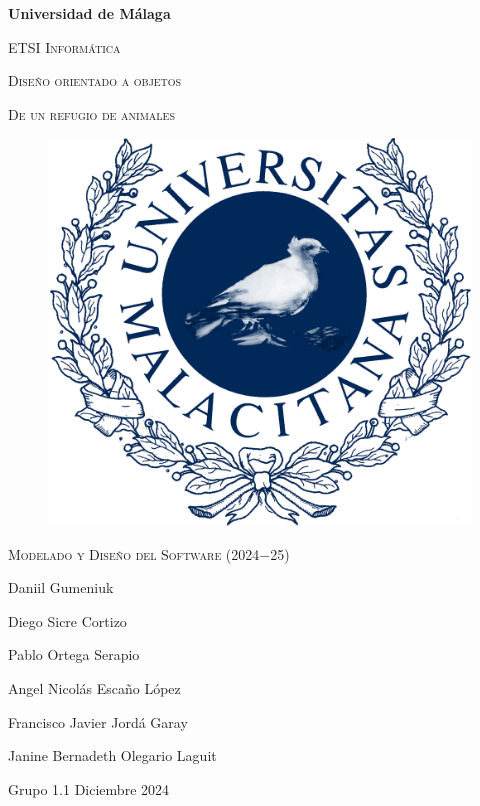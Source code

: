 \documentclass[12pt, a4paper, titlepage]{article}
\begin{document}
\begin{titlepage}
  \centering
  {\bfseries\LARGE Universidad de Málaga\par}
  \vspace{1cm}
  {\scshape\Large ETSI Informática\par}
  \vspace{2cm}
  {\scshape\Huge Diseño orientado a objetos\par}
  \vspace{0.1cm}
  {\scshape\Huge De un refugio de animales}
  \vspace{2cm}
  \begin{figure}[H]
      \centering
       \includegraphics[width=0.30\linewidth]{assets/umaLogo.png}
  \end{figure}
  \vfill
  {\scshape\Large Modelado y Diseño del Software (2024$-$25)\par}
  \vspace{0.5cm}
  {\Large Daniil Gumeniuk\par}
  {\Large Diego Sicre Cortizo\par}
  {\Large Pablo Ortega Serapio\par}
  {\Large Angel Nicolás Escaño López\par}
  {\Large Francisco Javier Jordá Garay\par}
  {\Large Janine Bernadeth Olegario Laguit\par}
  \vspace{1cm}
  {\Large Grupo 1.1}
  \vfill
  {\Large Diciembre 2024}
  
  \end{titlepage}

\tableofcontents %
\thispagestyle{empty} %

\newpage

\listoffigures %
\thispagestyle{empty}
\end{document}
